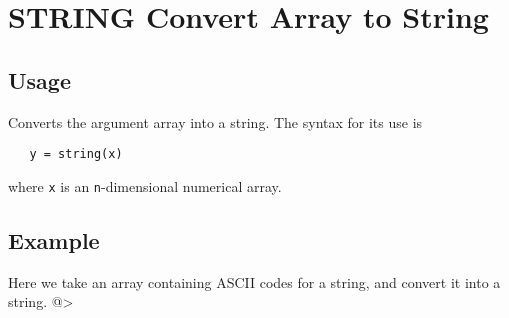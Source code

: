 \section{STRING Convert Array to String}

\subsection{Usage}

Converts the argument array into a string.  The syntax for its
use is
\begin{verbatim}
   y = string(x)
\end{verbatim}
where \verb|x| is an \verb|n|-dimensional numerical array.
\subsection{Example}

Here we take an array containing ASCII codes for a string, and
convert it into a string.
@>
